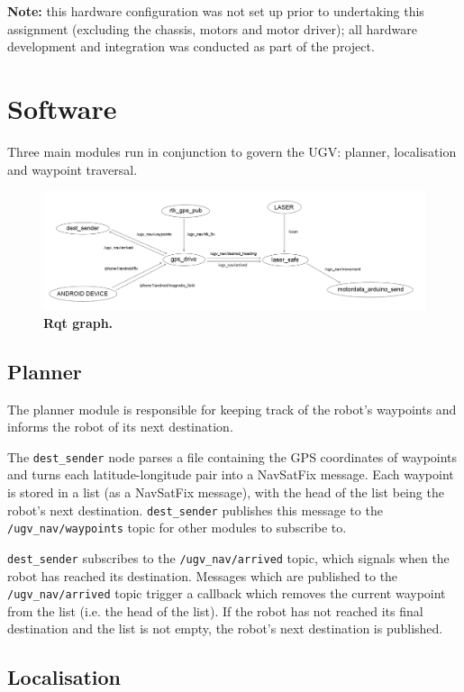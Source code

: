 \documentclass[titlepage,12pt,a4paper]{article}
\begin{document}
\textbf{Note:} this hardware configuration was not set up prior to undertaking this assignment (excluding the chassis, motors and motor driver); all hardware development and integration was conducted as part of the project.

\pagebreak
\section{Software}

Three main modules run in conjunction to govern the UGV: planner, localisation and waypoint traversal.

\begin{figure}[h]
	\centering
	\includegraphics[scale=0.255]{figures/rqt.png}
	\caption{\textbf{Rqt graph.}}
\end{figure}

\subsection{Planner}
The planner module is responsible for keeping track of the robot's waypoints and informs the robot of its next destination. 

The \verb|dest_sender| node parses a file containing the GPS coordinates of waypoints and turns each latitude-longitude pair into a NavSatFix message. Each waypoint is stored in a list (as a NavSatFix message), with the head of the list being the robot's next destination. \verb|dest_sender| publishes this message to the \verb|/ugv_nav/waypoints| topic for other modules to subscribe to.

\verb|dest_sender| subscribes to the \verb|/ugv_nav/arrived| topic, which signals when the robot has reached its destination. Messages which are published to the \verb|/ugv_nav/arrived| topic trigger a callback which removes the current waypoint from the list (i.e. the head of the list). If the robot has not reached its final destination and the list is not empty, the robot's next destination is published.

\subsection{Localisation}
\end{document}
